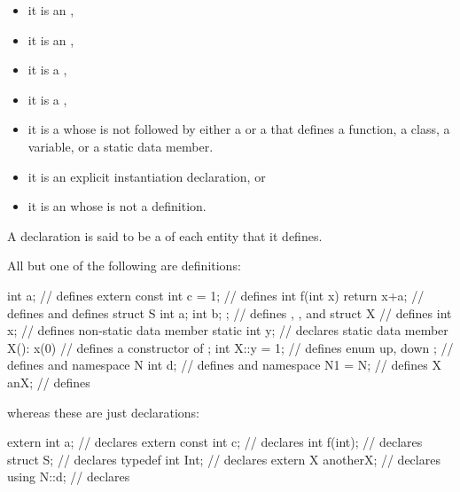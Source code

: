 \begin{itemize}
\item
it is an
,
\item
it is an
,
\item it is
a ,
\item it is
a ,
\item it is
a 
whose  is not followed by
either a  or a 
that defines a function, a class, a variable, or a static data member.
\item it is
an explicit instantiation declaration, or
\item it is
an  whose
 is not a definition.
\end{itemize}
A declaration is said to be a  of each entity that it defines.
\begin{example}
All but one of the following are definitions:
\begin{codeblock}
int a;                          // defines 
extern const int c = 1;         // defines 
int f(int x) { return x+a; }    // defines  and defines 
struct S { int a; int b; };     // defines , , and 
struct X {                      // defines 
  int x;                        // defines non-static data member 
  static int y;                 // declares static data member 
  X(): x(0) { }                 // defines a constructor of 
};
int X::y = 1;                   // defines 
enum { up, down };              // defines  and 
namespace N { int d; }          // defines  and 
namespace N1 = N;               // defines 
X anX;                          // defines 

\end{codeblock}
whereas these are just declarations:
\begin{codeblock}
extern int a;                   // declares 
extern const int c;             // declares 
int f(int);                     // declares 
struct S;                       // declares 
typedef int Int;                // declares 
extern X anotherX;              // declares 
using N::d;                     // declares 
\end{codeblock}
\end{example}

